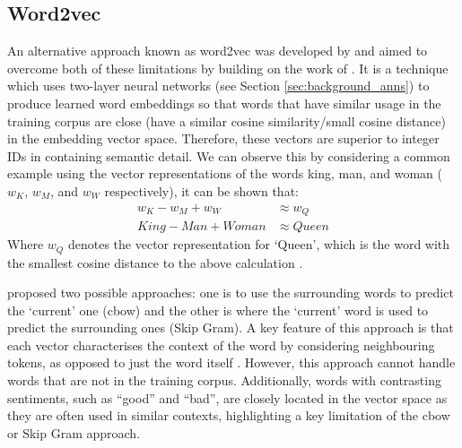 \subsection{Word2vec}\label{sec:embeddings_word2vec}
An alternative approach known as word2vec was developed by \citet{mikolov2013efficient} and aimed to overcome both of these limitations by building on the work of \citet{bengio2000neural}. It is a technique which uses two-layer neural networks (see Section \ref{sec:background_anns}) to produce learned word embeddings so that words that have similar usage in the training corpus are close (have a similar cosine similarity/small cosine distance) in the embedding vector space. Therefore, these vectors are superior to integer IDs in containing semantic detail. We can observe this by considering a common example using the vector representations of the words king, man, and woman ($w_K$, $w_M$, and $w_W$ respectively), it can be shown that:
\begin{equation*}
    \begin{aligned}
        w_K - w_M + w_W &\approx w_Q \\
        King - Man + Woman &\approx Queen
    \end{aligned}
\end{equation*}
Where $w_Q$ denotes the vector representation for `Queen', which is the word with the smallest cosine distance to the above calculation \citep{allen2019analogies}.

\cite{mikolov2013efficient} proposed two possible approaches: one is to use the surrounding words to predict the `current' one (\acrfull{cbow}) and the other is where the `current' word is used to predict the surrounding ones (Skip Gram). A key feature of this approach is that each vector characterises the context of the word by considering neighbouring tokens, as opposed to just the word itself \citep{li2018introduction}. However, this approach cannot handle words that are not in the training corpus. Additionally,  words with contrasting sentiments, such as ``good” and ``bad”, are closely located in the vector space \citep{sivakumar2020review} as they are often used in similar contexts, highlighting a key limitation of the \acrshort{cbow} or Skip Gram approach.


